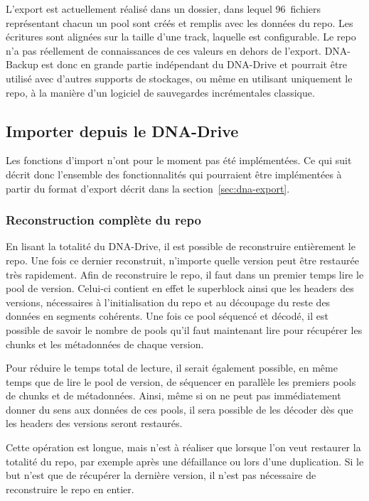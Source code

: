 \documentclass[a4paper]{report}
\begin{document}
L'export est actuellement réalisé dans un dossier, dans lequel 96~fichiers
représentant chacun un pool sont créés et remplis avec les données du repo.
Les écritures sont alignées sur la taille d'une track, laquelle est configurable.
Le repo n'a pas réellement de connaissances de ces valeurs en dehors de l'export.
DNA-Backup est donc en grande partie indépendant du DNA-Drive
et pourrait être utilisé avec d'autres supports de stockages,
ou même en utilisant uniquement le repo,
à la manière d'un logiciel de sauvegardes incrémentales classique.


\subsection{Importer depuis le DNA-Drive}

Les fonctions d'import n'ont pour le moment pas été implémentées.
Ce qui suit décrit donc l'ensemble des fonctionnalités qui pourraient être implémentées
à partir du format d'export décrit dans la section~\ref{sec:dna-export}.

\subsubsection{Reconstruction complète du repo}

En lisant la totalité du DNA-Drive, il est possible de reconstruire entièrement le repo.
Une fois ce dernier reconstruit, n'importe quelle version peut être restaurée très rapidement.
Afin de reconstruire le repo, il faut dans un premier temps lire le pool de version.
Celui-ci contient en effet le superblock ainsi que les headers des versions,
nécessaires à l'initialisation du repo et au découpage du reste des données en segments cohérents.
Une fois ce pool séquencé et décodé, il est possible de savoir
le nombre de pools qu'il faut maintenant lire pour récupérer les chunks
et les métadonnées de chaque version.

Pour réduire le temps total de lecture, il serait également possible,
en même temps que de lire le pool de version,
de séquencer en parallèle les premiers pools de chunks et de métadonnées.
Ainsi, même si on ne peut pas immédiatement donner du sens aux données de ces pools,
il sera possible de les décoder dès que les headers des versions seront restaurés.

Cette opération est longue, mais n'est à réaliser que lorsque l'on veut restaurer la totalité du repo,
par exemple après une défaillance ou lors d'une duplication.
Si le but n'est que de récupérer la dernière version,
il n'est pas nécessaire de reconstruire le repo en entier.
\end{document}
